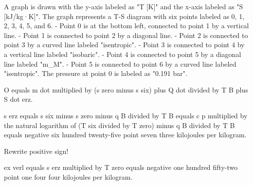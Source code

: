A graph is drawn with the y-axis labeled as "T [K]" and the x-axis labeled as "S [kJ/kg·K]". The graph represents a T-S diagram with six points labeled as 0, 1, 2, 3, 4, 5, and 6.  
- Point 0 is at the bottom left, connected to point 1 by a vertical line.  
- Point 1 is connected to point 2 by a diagonal line.  
- Point 2 is connected to point 3 by a curved line labeled "isentropic".  
- Point 3 is connected to point 4 by a vertical line labeled "isobaric".  
- Point 4 is connected to point 5 by a diagonal line labeled "m_M".  
- Point 5 is connected to point 6 by a curved line labeled "isentropic".  
The pressure at point 0 is labeled as "0.191 bar".

O equals m dot multiplied by (s zero minus s six) plus Q dot divided by T B plus S dot erz.  

s erz equals s six minus s zero minus q B divided by T B equals c p multiplied by the natural logarithm of (T six divided by T zero) minus q B divided by T B equals negative six hundred twenty-five point seven three kilojoules per kilogram.  

Rewrite positive sign!  

ex verl equals s erz multiplied by T zero equals negative one hundred fifty-two point one four four kilojoules per kilogram.